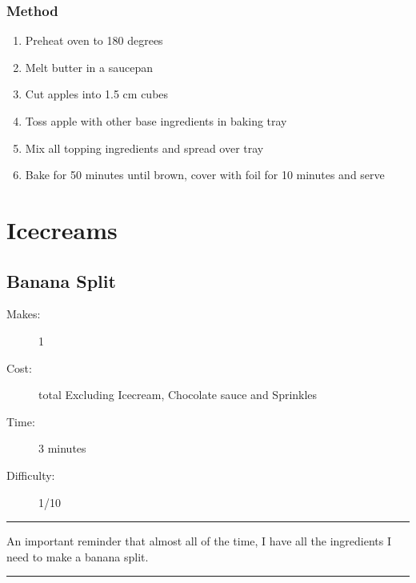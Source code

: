 \documentclass[]{article}
\begin{document}
\subsubsection*{\Large Method}
\begin{enumerate}[font=\huge\color{accent}]
	\item Preheat oven to 180 degrees
	\item Melt butter in a saucepan
	\item Cut apples into 1.5 cm cubes
	\item Toss apple with other base ingredients in baking tray
	\item Mix all topping ingredients and spread over tray
	\item Bake for 50 minutes until brown, cover with foil for 10 minutes and serve
\end{enumerate}
\newpage
{}
\section*{\center\Huge\color{accent}Icecreams}
\label{cat:Icecreams}
\label{rec:Banana Split}
\subsection*{\center\huge Banana Split}
\begin{description}
\item[Makes:] 1 
\item[Cost:]  total Excluding Icecream, Chocolate sauce and Sprinkles
\item[Time:] 3 minutes
\item[Difficulty:] 1/10
\end{description}
\vspace{0.2cm}\hrule\vspace{0.5cm}
\begin{adjustwidth}{0.5 cm}{0.5 cm}

An important reminder that almost all of the time, I have all the ingredients I need to make a banana split. \hfill{}\color{black}

\end{adjustwidth}
\vspace{0.5cm}\hrule
\end{document}
